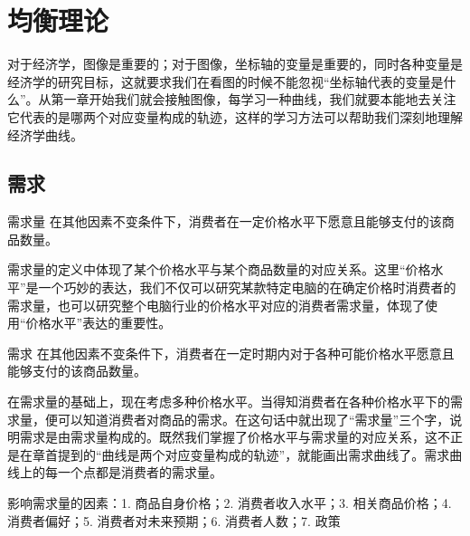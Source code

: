 \chapter{均衡理论}
\setlength{\parskip}{0.5\baselineskip}

对于经济学，图像是重要的；对于图像，坐标轴的变量是重要的，同时各种变量是经济学的研究目标，这就要求我们在看图的时候不能忽视“坐标轴代表的变量是什么”。从第一章开始我们就会接触图像，每学习一种曲线，我们就要本能地去关注它代表的是哪两个对应变量构成的轨迹，这样的学习方法可以帮助我们深刻地理解经济学曲线。

\section{需求}

\begin{definition}{需求量}
    在其他因素不变条件下，消费者在一定价格水平下愿意且能够支付的该商品数量。
\end{definition}

需求量的定义中体现了某个价格水平与某个商品数量的对应关系。这里“价格水平”是一个巧妙的表达，我们不仅可以研究某款特定电脑的在确定价格时消费者的需求量，也可以研究整个电脑行业的价格水平对应的消费者需求量，体现了使用“价格水平”表达的重要性。


\begin{definition}{需求}
    在其他因素不变条件下，消费者在一定时期内对于各种可能价格水平愿意且能够支付的该商品数量。
\end{definition}

在需求量的基础上，现在考虑多种价格水平。当得知消费者在各种价格水平下的需求量，便可以知道消费者对商品的需求。在这句话中就出现了“需求量”三个字，说明需求是由需求量构成的。既然我们掌握了价格水平与需求量的对应关系，这不正是在章首提到的“曲线是两个对应变量构成的轨迹”，就能画出需求曲线了。需求曲线上的每一个点都是消费者的需求量。



影响需求量的因素：1. 商品自身价格；2. 消费者收入水平；3. 相关商品价格；4. 消费者偏好；5. 消费者对未来预期；6. 消费者人数；7. 政策
